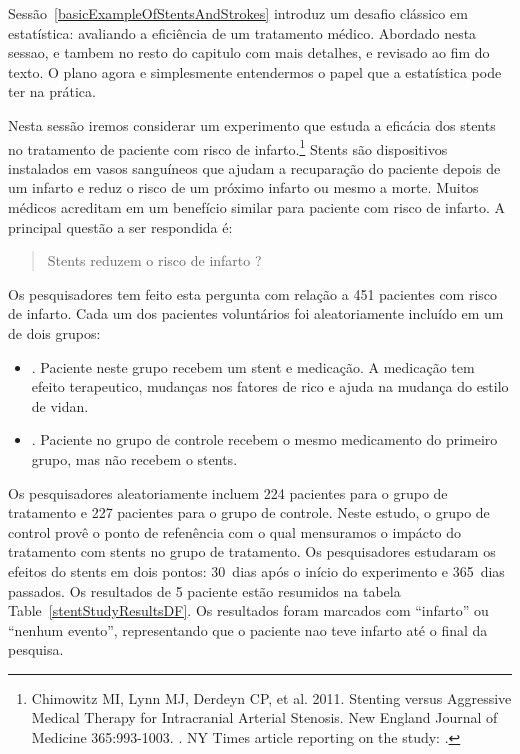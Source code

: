 
Sessão~\ref{basicExampleOfStentsAndStrokes} introduz um desafio clássico em estatística: avaliando a eficiência de um tratamento médico. Abordado nesta sessao, e tambem no resto do capitulo com mais detalhes, e revisado ao fim do texto. O plano agora e simplesmente entendermos o papel que a estatística pode ter na prática.

Nesta sessão iremos considerar um experimento que estuda a eficácia dos stents no tratamento de paciente com risco de infarto.\footnote{Chimowitz MI, Lynn MJ, Derdeyn CP, et al. 2011. Stenting versus Aggressive Medical Therapy for Intracranial Arterial Stenosis. New England Journal of Medicine 365:993-1003. . NY Times article reporting on the study: .} Stents são dispositivos instalados em vasos sanguíneos que ajudam a recuparação do paciente depois de um infarto e reduz o risco de um próximo infarto ou mesmo a morte. Muitos médicos acreditam em um benefício similar para paciente com risco de infarto. A principal questão a ser respondida é:
\begin{quote}
Stents reduzem o risco de infarto ?
\end{quote}

Os pesquisadores tem feito esta pergunta com relação a 451 pacientes com risco de infarto. Cada um dos pacientes voluntários foi aleatoriamente incluído em um de dois grupos:
\begin{itemize}
\item[]. Paciente neste grupo recebem um stent e medicação. A medicação tem efeito terapeutico, mudanças nos fatores de rico e ajuda na mudança do estilo de vidan.
\item[]. Paciente no grupo de controle recebem o mesmo medicamento do primeiro grupo, mas não recebem o stents.
\end{itemize}
Os pesquisadores aleatoriamente incluem 224 pacientes para o grupo de tratamento e 227 pacientes para o grupo de controle. Neste estudo, o grupo de control provê o ponto de refenência com o qual mensuramos o impácto do tratamento com stents no grupo de tratamento. 
Os pesquisadores estudaram os efeitos do stents em dois pontos: 30~dias após o início do experimento e 365~dias passados. Os resultados de 5 paciente estão resumidos na tabela Table~\ref{stentStudyResultsDF}. Os resultados foram marcados com ``infarto'' ou ``nenhum evento'', representando que o paciente nao teve infarto até o final da pesquisa.

